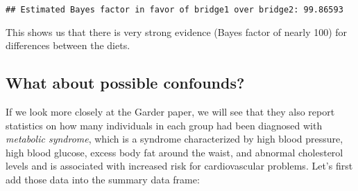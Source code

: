 \documentclass[]{book}
\newenvironment{Shaded}{\begin{snugshade}}{\end{snugshade}}
\newcommand{\KeywordTok}[1]{\textcolor[rgb]{0.13,0.29,0.53}{\textbf{#1}}}
\newcommand{\DataTypeTok}[1]{\textcolor[rgb]{0.13,0.29,0.53}{#1}}
\newcommand{\DecValTok}[1]{\textcolor[rgb]{0.00,0.00,0.81}{#1}}
\newcommand{\StringTok}[1]{\textcolor[rgb]{0.31,0.60,0.02}{#1}}
\newcommand{\OperatorTok}[1]{\textcolor[rgb]{0.81,0.36,0.00}{\textbf{#1}}}
\newcommand{\NormalTok}[1]{#1}
\theoremstyle{definition}
\theoremstyle{definition}
\theoremstyle{definition}
\theoremstyle{remark}
\begin{document}
\begin{verbatim}
## Estimated Bayes factor in favor of bridge1 over bridge2: 99.86593
\end{verbatim}

This shows us that there is very strong evidence (Bayes factor of nearly
100) for differences between the diets.

\subsection{What about possible
confounds?}\label{what-about-possible-confounds}

If we look more closely at the Garder paper, we will see that they also
report statistics on how many individuals in each group had been
diagnosed with \emph{metabolic syndrome}, which is a syndrome
characterized by high blood pressure, high blood glucose, excess body
fat around the waist, and abnormal cholesterol levels and is associated
with increased risk for cardiovascular problems. Let's first add those
data into the summary data frame:

\begin{Shaded}
\end{Shaded}
\end{document}
